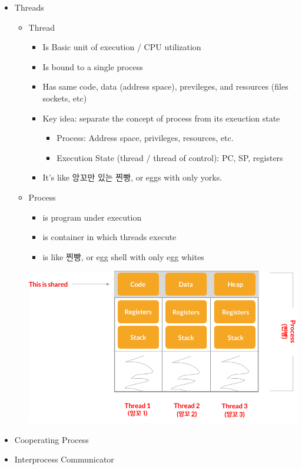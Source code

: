 \documentclass[12pt]{article}
\begin{document}
\begin{itemize}
\begin{itemize}
\begin{enumerate}[1.]
\begin{itemize}
            \end{itemize}
        \end{enumerate}

    \end{itemize}
    \item Threads
    \begin{itemize}
        \item Thread
        \begin{itemize}
            \item Is Basic unit of execution / CPU utilization
            \item Is bound to a single process
            \item Has same code, data (address space), previleges, and resources
            (files sockets, etc)
            \item Key idea: separate the concept of process from its exeuction state

            \begin{itemize}
                \item Process: Address space, privileges, resources, etc.
                \item Execution State (thread / thread of control): PC, SP, registers
            \end{itemize}
            \item It's like 앙꼬만 있는 찐빵, or eggs with only yorks.
        \end{itemize}
        \item Process
        \begin{itemize}
            \item is program under execution
            \item is container in which threads execute
            \item is like 찐빵, or egg shell with only egg whites
        \end{itemize}

        \begin{center}
        \includegraphics[width=0.8\linewidth]{images/week_1_notes_1_12.png}
        \end{center}
    \end{itemize}
    \item Cooperating Process
    \item Interprocess Communicator
\end{itemize}
\end{document}
